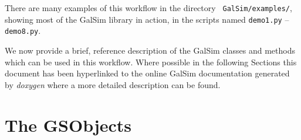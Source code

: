 \documentclass[preprint,11pt]{aastex}
\begin{document}
There are many examples of this workflow in the directory {\tt
  GalSim/examples/}, showing most of the GalSim library in
action, in the scripts named
\texttt{demo1.py} -- \texttt{demo8.py}.  

We now provide a brief, reference description of the GalSim classes and methods which
can be used in this workflow.  Where possible in the following
Sections this document has been
hyperlinked to the online GalSim documentation generated by
\emph{doxygen} where a more detailed description can be found.

\newpage

\section{The GSObjects}\label{sect:gsobjects}
\end{document}
